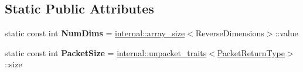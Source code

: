 \subsection*{Static Public Attributes}
\begin{DoxyCompactItemize}
\item 
\mbox{\label{struct_eigen_1_1_tensor_evaluator_3_01const_01_tensor_reverse_op_3_01_reverse_dimensions_00_01_arg_type_01_4_00_01_device_01_4_a7a98c7242a9a6d4082ea1e3d5ca7afbc}} 
static const int {\bfseries Num\+Dims} = \hyperlink{struct_eigen_1_1internal_1_1array__size}{internal\+::array\+\_\+size}$<$Reverse\+Dimensions$>$\+::value
\item 
\mbox{\label{struct_eigen_1_1_tensor_evaluator_3_01const_01_tensor_reverse_op_3_01_reverse_dimensions_00_01_arg_type_01_4_00_01_device_01_4_ab2bc822fdddba742f2984e17a3c4aabf}} 
static const int {\bfseries Packet\+Size} = \hyperlink{struct_eigen_1_1internal_1_1unpacket__traits}{internal\+::unpacket\+\_\+traits}$<$\hyperlink{group___sparse_core___module}{Packet\+Return\+Type}$>$\+::size
\end{DoxyCompactItemize}

